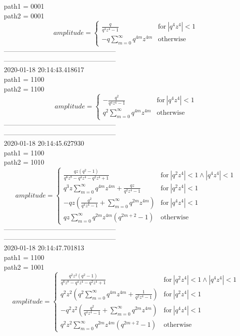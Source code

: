 \documentclass{jsreport}
\begin{document}
path1 = 0001\\
path2 = 0001\\
$$amplitude = \begin{cases} \frac{q}{q^{4} z^{4} - 1} & \text{for}\: \left|{q^{4} z^{4}}\right| < 1 \\- q \sum_{m=0}^{\infty} q^{4 m} z^{4 m} & \text{otherwise} \end{cases}$$
--------------------------------------------------\\
--------------------------------------------------\\
2020-01-18 20:14:43.418617\\
path1 = 1100\\
path2 = 1100\\
$$amplitude = \begin{cases} - \frac{q^{2}}{q^{4} z^{4} - 1} & \text{for}\: \left|{q^{4} z^{4}}\right| < 1 \\q^{2} \sum_{m=0}^{\infty} q^{4 m} z^{4 m} & \text{otherwise} \end{cases}$$
--------------------------------------------------\\
--------------------------------------------------\\
2020-01-18 20:14:45.627930\\
path1 = 1100\\
path2 = 1010\\
$$amplitude = \begin{cases} \frac{q z \left(q^{2} - 1\right)}{q^{6} z^{8} - q^{4} z^{4} - q^{2} z^{4} + 1} & \text{for}\: \left|{q^{2} z^{4}}\right| < 1 \wedge \left|{q^{4} z^{4}}\right| < 1 \\q^{3} z \sum_{m=0}^{\infty} q^{4 m} z^{4 m} + \frac{q z}{q^{2} z^{4} - 1} & \text{for}\: \left|{q^{2} z^{4}}\right| < 1 \\- q z \left(\frac{q^{2}}{q^{4} z^{4} - 1} + \sum_{m=0}^{\infty} q^{2 m} z^{4 m}\right) & \text{for}\: \left|{q^{4} z^{4}}\right| < 1 \\q z \sum_{m=0}^{\infty} q^{2 m} z^{4 m} \left(q^{2 m + 2} - 1\right) & \text{otherwise} \end{cases}$$
--------------------------------------------------\\
--------------------------------------------------\\
2020-01-18 20:14:47.701813\\
path1 = 1100\\
path2 = 1001\\
$$amplitude = \begin{cases} \frac{q^{2} z^{2} \left(q^{2} - 1\right)}{q^{6} z^{8} - q^{4} z^{4} - q^{2} z^{4} + 1} & \text{for}\: \left|{q^{2} z^{4}}\right| < 1 \wedge \left|{q^{4} z^{4}}\right| < 1 \\q^{2} z^{2} \left(q^{2} \sum_{m=0}^{\infty} q^{4 m} z^{4 m} + \frac{1}{q^{2} z^{4} - 1}\right) & \text{for}\: \left|{q^{2} z^{4}}\right| < 1 \\- q^{2} z^{2} \left(\frac{q^{2}}{q^{4} z^{4} - 1} + \sum_{m=0}^{\infty} q^{2 m} z^{4 m}\right) & \text{for}\: \left|{q^{4} z^{4}}\right| < 1 \\q^{2} z^{2} \sum_{m=0}^{\infty} q^{2 m} z^{4 m} \left(q^{2 m + 2} - 1\right) & \text{otherwise} \end{cases}$$
\end{document}
